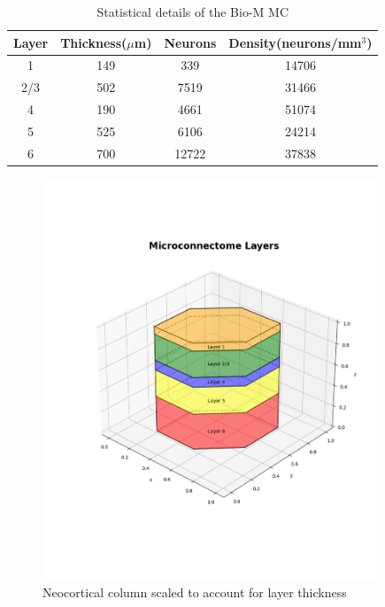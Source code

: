 \begin{center}
\begin{table}[H]
    \centering
    \captionsetup{justification=centering}
     \begin{tabular}{||c | c | c | c||}
 \hline
 Layer & Thickness(\(\mu\)m) & Neurons & Density(neurons/mm\(^3\)) \\ [0.5ex]
 \hline\hline
 1 & 149 & 339 & 14706 \\
 \hline
 2/3 & 502 & 7519 & 31466 \\
 \hline
 4 & 190 & 4661 & 51074 \\
 \hline
 5 & 525 & 6106 & 24214 \\
 \hline
 6 & 700 & 12722 & 37838 \\
 \hline
 \hline
\end{tabular}
    \caption{Statistical details of the Bio-M MC}
    \label{tab:my_label}
\end{table}

\end{center}
\begin{figure}[H]
\begin{center}
\captionsetup{justification=centering}
\includegraphics[width=10cm]{BioM/connectome.png}
\caption[center]{Neocortical column scaled to account for layer thickness}
\end{center}
\end{figure}



